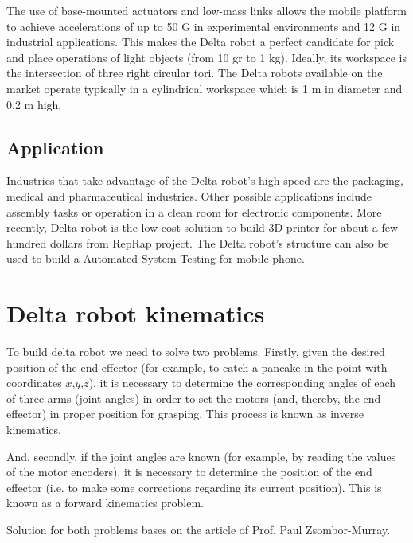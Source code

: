 The use of base-mounted actuators and low-mass links allows the mobile platform to achieve accelerations of up to 50 G in experimental environments and 12 G in industrial applications. This makes the Delta robot a perfect candidate for pick and place operations of light objects (from 10 gr to 1 kg). Ideally, its workspace is the intersection of three right circular tori. The Delta robots available on the market operate typically in a cylindrical workspace which is 1 m in diameter and 0.2 m high.

\subsection{Application}

Industries that take advantage of the Delta robot’s high speed are the packaging, medical and pharmaceutical industries. Other possible applications include assembly tasks or operation in a clean room for electronic components. More recently, Delta robot is the low-cost solution to build 3D printer for about a few hundred dollars from RepRap project\cite{reprap_thesis}. The Delta robot’s structure can also be used to build a Automated System Testing for mobile phone.

\section{Delta robot kinematics}



To build delta robot we need to solve two problems. Firstly, given the desired position of the end effector (for example, to catch a pancake in the point with coordinates $x$,$y$,$z$), it is necessary to determine the corresponding angles of each of three arms (joint angles) in order to set the motors (and, thereby, the end effector) in proper position for grasping. This process is known as inverse kinematics. 

And, secondly, if the joint angles are known (for example, by reading the values of the motor encoders), it is necessary to determine the position of the end effector (i.e. to make some corrections regarding its current position). This is known as a forward kinematics problem. 

Solution for both problems bases on the article of Prof. Paul Zsombor-Murray\cite{geometric_kinematic_analysis_thesis}. 

